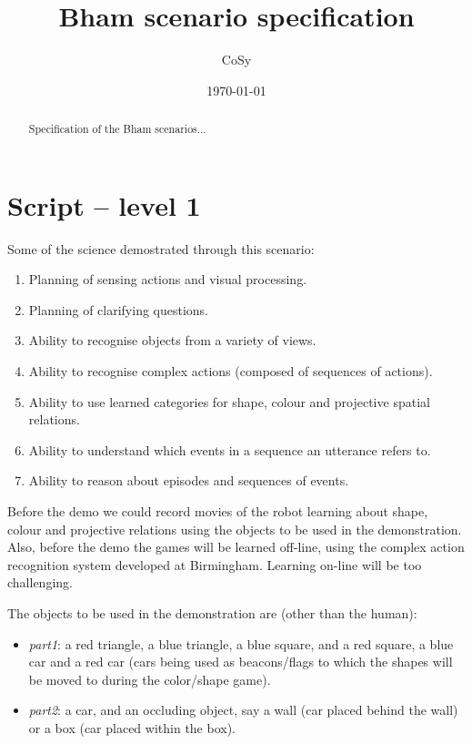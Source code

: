 \documentclass{article}
\title{Bham scenario specification}
\date{\today}
\author{CoSy}
\begin{document}
\maketitle
\begin{abstract}
Specification of the Bham scenarios...
\end{abstract}


\section{Script -- level 1}
Some of the science demostrated through this scenario:
\begin{enumerate}
\item Planning of sensing actions and visual processing.
\item Planning of clarifying questions.
\item Ability to recognise objects from a variety of views.
\item Ability to recognise complex actions (composed of sequences of
  actions).  
\item Ability to use learned categories for shape, colour and
  projective spatial relations.
\item Ability to understand which events in a sequence an utterance
  refers to.
\item Ability to reason about episodes and sequences of events.
\end{enumerate}

Before the demo we could record movies of the robot learning about
shape, colour and projective relations using the objects to be used in
the demonstration. Also, before the demo the games will be learned
off-line, using the complex action recognition system developed at
Birmingham. Learning on-line will be too challenging.

The objects to be used in the demonstration are (other than the human):
\begin{itemize}
\item \emph{part1}: a red triangle, a blue triangle, a blue square,
  and a red square, a blue car and a red car (cars being used as
  beacons/flags to which the shapes will be moved to during the
  color/shape game).
\item \emph{part2}: a car, and an occluding object, say a wall (car
  placed behind the wall) or a box (car placed within the box). 
\end{itemize}
\end{document}
